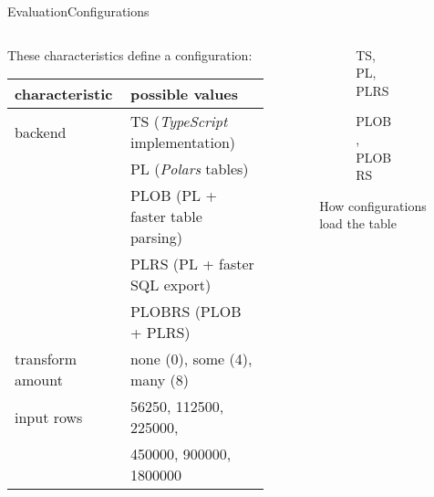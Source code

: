 \begin{frame}[t]{Evaluation}{Configurations}
	\begin{columns}[T]
		\begin{column}{0.5\linewidth}
			These characteristics define a configuration:\\
			\begin{tabular}{|l|l|}
				\hline
				characteristic   & possible values                       \\
				\hline
				\hline
				backend          & TS (\emph{TypeScript} implementation) \\
				                 & PL (\emph{Polars} tables)             \\
				                 & PLOB (PL + faster table parsing)      \\
				                 & PLRS (PL + faster SQL export)         \\
				                 & PLOBRS (PLOB + PLRS)                  \\
				\hline
				transform amount & none (0), some (4), many (8)          \\
				\hline
				input rows       & 56250, 112500, 225000,                \\
				                 & 450000, 900000, 1800000               \\
				\hline
			\end{tabular}
		\end{column}
		\begin{column}{0.5\linewidth}
			\only<2> {
				\begin{figure}
					\begin{subfigure}{0.45\linewidth}
						\centering
						
						\caption{TS, PL, PLRS}
					\end{subfigure}
					\begin{subfigure}{0.45\linewidth}
						\centering
						
						\caption{PLOB, PLOBRS}
					\end{subfigure}
					\caption{How configurations load the table}
				\end{figure}
			}
		\end{column}
	\end{columns}
\end{frame}

